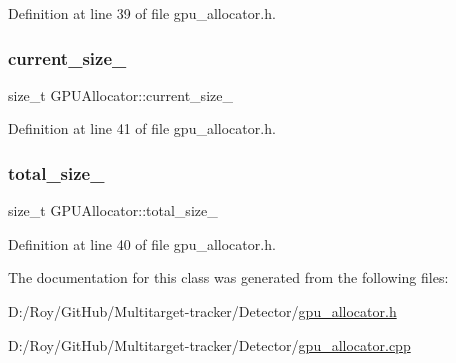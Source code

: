 Definition at line 39 of file gpu\+\_\+allocator.\+h.

\mbox{\label{class_g_p_u_allocator_a8d404f40928c431ced08c013189c8c58}} 
\subsubsection{\texorpdfstring{current\+\_\+size\+\_\+}{current\_size\_}}
{\footnotesize\ttfamily size\+\_\+t G\+P\+U\+Allocator\+::current\+\_\+size\+\_\+\hspace{0.3cm}{\ttfamily [private]}}



Definition at line 41 of file gpu\+\_\+allocator.\+h.

\mbox{\label{class_g_p_u_allocator_a629bd3cca49d00f82cd6538e0d07d4ae}} 
\subsubsection{\texorpdfstring{total\+\_\+size\+\_\+}{total\_size\_}}
{\footnotesize\ttfamily size\+\_\+t G\+P\+U\+Allocator\+::total\+\_\+size\+\_\+\hspace{0.3cm}{\ttfamily [private]}}



Definition at line 40 of file gpu\+\_\+allocator.\+h.



The documentation for this class was generated from the following files\+:\begin{DoxyCompactItemize}
\item 
D\+:/\+Roy/\+Git\+Hub/\+Multitarget-\/tracker/\+Detector/\mbox{\hyperlink{gpu__allocator_8h}{gpu\+\_\+allocator.\+h}}\item 
D\+:/\+Roy/\+Git\+Hub/\+Multitarget-\/tracker/\+Detector/\mbox{\hyperlink{gpu__allocator_8cpp}{gpu\+\_\+allocator.\+cpp}}\end{DoxyCompactItemize}
